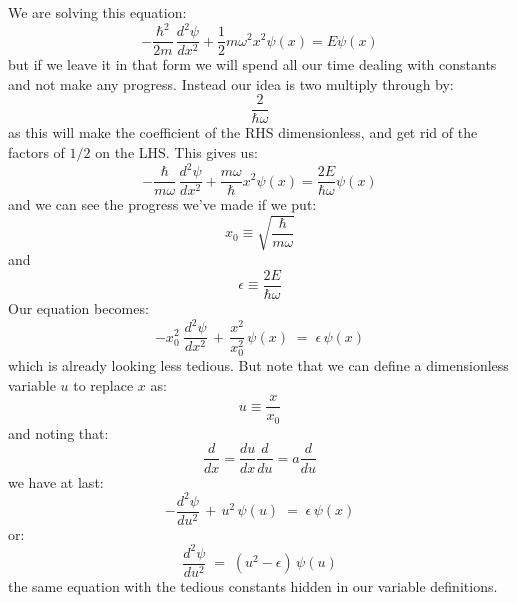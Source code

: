 \documentclass[12pt]{book}
\begin{document}
We are solving this equation:
\begin{equation*}
-\frac{\hbar^2}{2m}\,\frac{d^2 \psi}{d x^2} + \frac{1}{2} m \omega^2 x^2 \psi(x) = E \psi(x)
\end{equation*}
but if we leave it in that form we will spend all our time dealing with constants and not make any progress.  Instead our idea is two multiply through by:
$$\frac{2}{\hbar \omega}$$
as this will make the coefficient of the RHS dimensionless, and get rid of the factors of $1/2$ on the LHS.  This gives us:
\begin{equation*}
-\frac{\hbar}{m\omega}\,\frac{d^2 \psi}{d x^2} + \frac{m \omega}{\hbar} x^2 \psi(x) = \frac{2E}{\hbar\omega} \psi(x)
\end{equation*}
and we can see the progress we've made if we put:
$$x_0 \equiv \sqrt{\frac{\hbar}{m \omega}}$$ 
and 
$$\epsilon \equiv \frac{2E}{\hbar\omega} $$
Our equation becomes:
\begin{equation*}
-x_0^2 \; \frac{d^2 \psi}{d x^2} \, + \, \frac{x^2}{x_0^2} \, \psi(x) \; = \; \epsilon \, \psi(x)
\end{equation*}
which is already looking less tedious.  But note that we can define a dimensionless variable $u$ to replace $x$ as:
$$u \equiv \frac{x}{x_0}$$
and noting that:
$$\frac{d}{dx} = \frac{du}{dx}\frac{d}{du} = a \frac{d}{du}$$
we have at last:
\begin{equation*}
-\frac{d^2 \psi}{d u^2} \, + \, u^2 \, \psi(u) \; = \; \epsilon \, \psi(x)
\end{equation*}
or:
\begin{equation*}
\frac{d^2 \psi}{d u^2} \; =  \; (u^2 - \epsilon) \, \psi(u) 
\end{equation*}
the same equation with the tedious constants hidden in our variable definitions.
\end{document}

